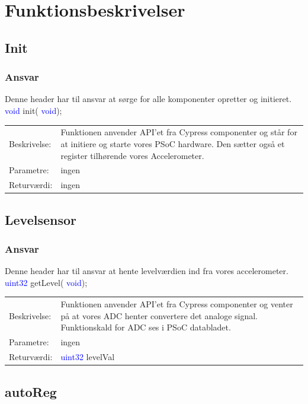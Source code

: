 \section{Funktionsbeskrivelser}
\subsection{Init}
\subsubsection{Ansvar}
Denne header har til ansvar at sørge for alle komponenter opretter og initieret.
\textcolor{blue}{void} init( \textcolor{blue}{void}); 
\begin{table}[H]
\begin{tabular}{l p{12.5cm}}
\hline
Beskrivelse:& Funktionen anvender API'et fra Cypress componenter og står for at initiere og starte vores PSoC hardware. Den sætter også et register tilhørende vores Accelerometer. \\
Parametre:&ingen\\
Returværdi:&ingen\\
\end{tabular}
\end{table}
\subsection{Levelsensor}
\subsubsection{Ansvar}
Denne header har til ansvar at hente levelværdien ind fra vores accelerometer.
\textcolor{blue}{uint32} getLevel( \textcolor{blue}{void}); 
\begin{table}[H]
\begin{tabular}{l p{12.5cm}}
\hline
Beskrivelse:& Funktionen anvender API'et fra Cypress componenter og venter på at vores ADC henter convertere det analoge signal. Funktionskald for ADC ses i PSoC databladet. \\
Parametre:&ingen\\
Returværdi:&\textcolor{blue}{uint32} levelVal\\
\end{tabular}
\end{table}
\subsection{autoReg}
